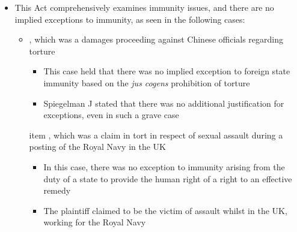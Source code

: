 \begin{itemize}
    \item This Act comprehensively examines immunity issues, and there are no implied exceptions to immunity, as seen in the following cases:
    \begin{itemize}
        \item {}, which was a damages proceeding against Chinese officials regarding torture
        \begin{itemize}
            \item This case held that there was no implied exception to foreign state immunity based on the \textit{jus cogens} prohibition of torture
            \item Spiegelman J stated that there was no additional justification for exceptions, even in such a grave case
        \end{itemize}
        item , which was a claim in tort in respect of sexual assault during a posting of the Royal Navy in the UK
        \begin{itemize}
            \item In this case, there was no exception to immunity arising from the duty of a state to provide the human right of a right to an effective remedy
            \item The plaintiff claimed to be the victim of assault whilst in the UK, working for the Royal Navy
        \end{itemize}
    \end{itemize}
\end{itemize}

